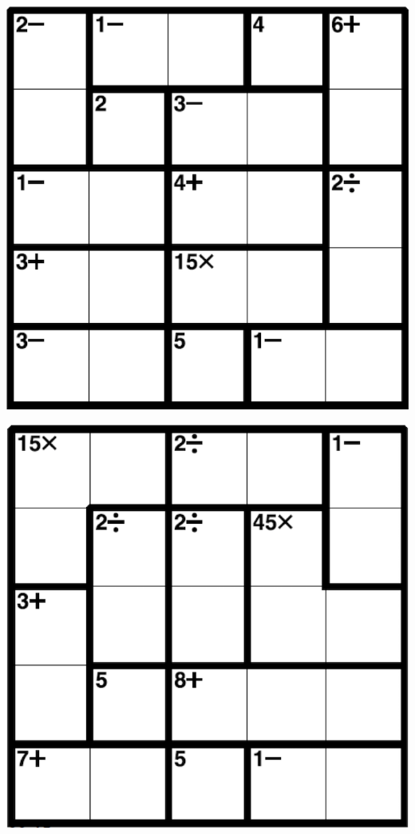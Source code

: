 
\includegraphics[scale=1]{Gambar/Lampiran/5x5_13.png}

\includegraphics[scale=1]{Gambar/Lampiran/5x5_14.png}
